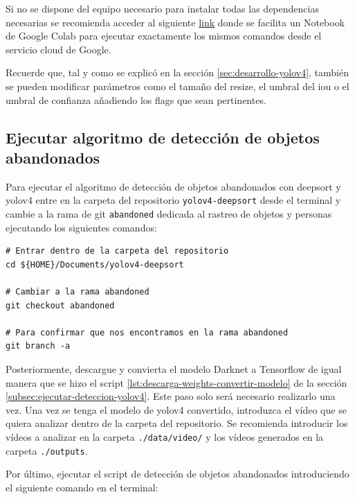 Si no se dispone del equipo necesario para instalar todas las dependencias necesarias se recomienda acceder al siguiente \href{https://colab.research.google.com/drive/18vL9LH8e9VaimA9LzBD35Cn4AOm6C17I?usp=sharing}{link} donde se facilita un Notebook de Google Colab para ejecutar exactamente los mismos comandos desde el servicio cloud de Google.

Recuerde que, tal y como se explicó en la sección \ref{sec:desarrollo-yolov4}, también se pueden modificar parámetros como el tamaño del resize, el umbral del \gls{iou} o el umbral de confianza añadiendo los flags que sean pertinentes.

\subsection{Ejecutar algoritmo de detección de objetos abandonados}
\label{subsec:ejecutar-deteccion-abandoned-object}

Para ejecutar el algoritmo de detección de objetos abandonados con \gls{deepsort} y \gls{yolov4} entre en la carpeta del repositorio \texttt{yolov4-deepsort} desde el terminal y cambie a la rama de git \texttt{abandoned} dedicada al rastreo de objetos y personas ejecutando los siguientes comandos:

\vspace{0.5cm}
\begin{lstlisting}[language=iPython,caption=cambiar a la rama abandoned,captionpos=b,label={lst:git-checkout-abandoned}]
# Entrar dentro de la carpeta del repositorio
cd ${HOME}/Documents/yolov4-deepsort

# Cambiar a la rama abandoned 
git checkout abandoned

# Para confirmar que nos encontramos en la rama abandoned
git branch -a
\end{lstlisting}

Posteriormente, descargue y convierta el modelo Darknet a Tensorflow de igual manera que se hizo el script \ref{lst:descarga-weights-convertir-modelo} de la sección \ref{subsec:ejecutar-deteccion-yolov4}. Este paso solo será necesario realizarlo una vez. Una vez se tenga el modelo de \gls{yolov4} convertido, introduzca el vídeo que se quiera analizar dentro de la carpeta del repositorio. Se recomienda introducir los vídeos a analizar en la carpeta \texttt{./data/video/} y los vídeos generados en la carpeta \texttt{./outputs}.

Por último, ejecutar el script de detección de objetos abandonados introduciendo el siguiente comando en el terminal:

